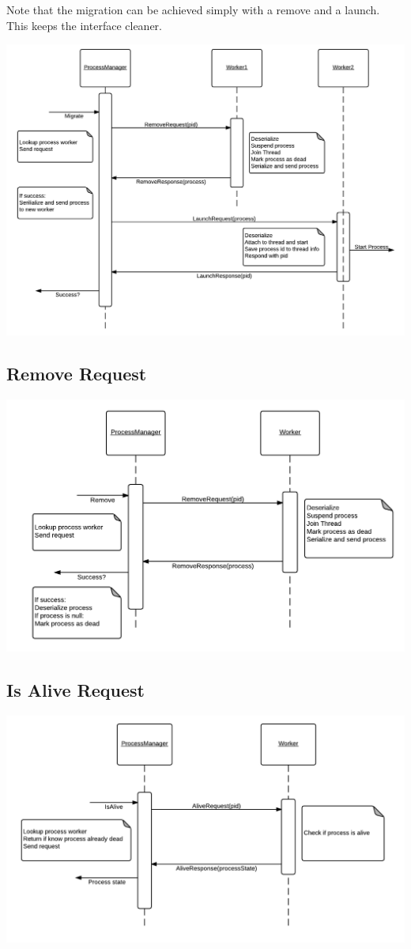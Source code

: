\documentclass[12pt]{article}
\begin{document}
Note that the migration can be achieved simply with a remove and a launch. This keeps the interface cleaner.

\includegraphics[scale=.3]{migrate.png}

\subsection{Remove Request}

\includegraphics[scale=.4]{remove.png}

\subsection{Is Alive Request}

\includegraphics[scale=.4]{alive.png}
\end{document}
